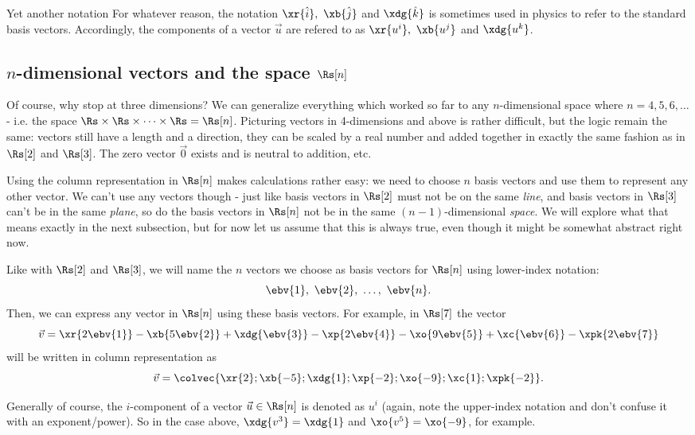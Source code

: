 \begin{note}{Yet another notation \shrug}{}
  For whatever reason, the notation $\xr{\hat{i}},\ \xb{\hat{j}}$ and $\xdg{\hat{k}}$ is sometimes used in physics to refer to the standard basis vectors. Accordingly, the components of a vector $\vec{u}$ are refered to as $\xr{u^{i}},\ \xb{u^{j}}$ and $\xdg{u^{k}}$.
\end{note}

\subsection{$n$-dimensional vectors and the space $\Rs[n]$}
Of course, why stop at three dimensions? We can generalize everything which worked so far to any $n$-dimensional space where $n=4,5,6,\dots$ - i.e. the space $\Rs\times\Rs\times\cdots\times\Rs=\Rs[n]$. Picturing vectors in 4-dimensions and above is rather difficult, but the logic remain the same: vectors still have a length and a direction, they can be scaled by a real number and added together in exactly the same fashion as in $\Rs[2]$ and $\Rs[3]$. The zero vector $\vec{0}$ exists and is neutral to addition, etc.

Using the column representation in $\Rs[n]$ makes calculations rather easy: we need to choose $n$ basis vectors and use them to represent any other vector. We can't use any vectors though - just like basis vectors in $\Rs[2]$ must not be on the same \textit{line}, and basis vectors in $\Rs[3]$ can't be in the same \textit{plane}, so do the basis vectors in $\Rs[n]$ not be in the same $\left(n-1\right)$-dimensional \textit{space}. We will explore what that means exactly in the next subsection, but for now let us assume that this is always true, even though it might be somewhat abstract right now.

Like with $\Rs[2]$ and $\Rs[3]$, we will name the $n$ vectors we choose as basis vectors for $\Rs[n]$ using lower-index notation:
\[
  \ebv{1},\ \ebv{2},\ \dots,\ \ebv{n}.
\]
Then, we can express any vector in $\Rs[n]$ using these basis vectors. For example, in $\Rs[7]$ the vector
\[
  \vec{v} = \xr{2\ebv{1}}-\xb{5\ebv{2}}+\xdg{\ebv{3}}-\xp{2\ebv{4}}-\xo{9\ebv{5}}+\xc{\ebv{6}}-\xpk{2\ebv{7}}
\]
will be written in column representation as
\[
  \vec{v} = \colvec{\xr{2};\xb{-5};\xdg{1};\xp{-2};\xo{-9};\xc{1};\xpk{-2}}.
\]

Generally of course, the $i$-component of a vector $\vec{u}\in\Rs[n]$ is denoted as $u^{i}$ (again, note the upper-index notation and don't confuse it with an exponent/power). So in the case above, $\xdg{v^{3}}=\xdg{1}$ and $\xo{v^{5}}=\xo{-9}$, for example.

